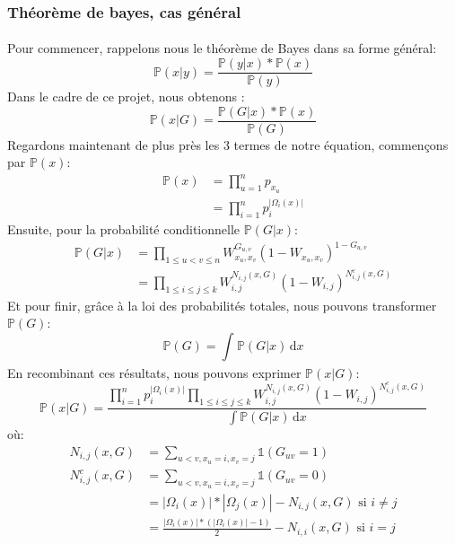 \subsubsection{Théorème de bayes, cas général}
\paragraph{}
Pour commencer, rappelons nous le théorème de Bayes dans sa forme général:
\begin{equation*}
    \mathbb{P}(x|y) = \frac{\mathbb{P}(y|x)*\mathbb{P}(x)}{\mathbb{P}(y)}
\end{equation*}
Dans le cadre de ce projet, nous obtenons :
\begin{equation*}
    \mathbb{P}(x|G) = \frac{\mathbb{P}(G|x)*\mathbb{P}(x)}{\mathbb{P}(G)}
\end{equation*}
Regardons maintenant de plus près les 3 termes de notre équation, commençons par $\mathbb{P}(x)$:
\begin{align*}
    \mathbb{P}(x) &= \prod_{u=1}^n p_{x_u} \\ 
                  &= \prod_{i=1}^n p_i^{|\Omega_i(x)|}
\end{align*}
Ensuite, pour la probabilité conditionnelle $\mathbb{P}(G|x)$:
\begin{align*}
    \mathbb{P}(G|x) &= \prod_{1 \leq u < v \leq n} W_{x_u,x_v}^{G_{u,v}} (1-W_{x_u,x_v})^{1-G_{u,v}}\\ 
                    &= \prod_{1 \leq i \leq j \leq k} W_{i,j}^{N_{i,j}(x,G)} (1-W_{i,j})^{N_{i,j}^c(x,G)}
\end{align*}
Et pour finir, grâce à la loi des probabilités totales, nous pouvons transformer $\mathbb{P}(G)$: 
\begin{equation*}
    \mathbb{P}(G) = \int_{}^{} \mathbb{P}(G|x) \, \mathrm{d}x
\end{equation*}
En recombinant ces résultats, nous pouvons exprimer $\mathbb{P}(x|G)$:
\begin{equation*}
    \mathbb{P}(x|G) = \frac{\prod_{i=1}^n p_i^{|\Omega_i(x)|} \prod_{1 \leq i \leq j \leq k} W_{i,j}^{N_{i,j}(x,G)} (1-W_{i,j})^{N_{i,j}^c(x,G)}}{ \int\mathbb{P}(G|x) \, \mathrm{d}x}
\end{equation*}
où:
\begin{align*}
    N_{i,j}(x,G)&=\sum_{u<v,x_u=i,x_v=j} \mathbb{1} (G_{uv}=1) \\
    N_{i,j}^c(x,G) &= \sum_{u<v,x_u=i,x_v=j} \mathbb{1} (G_{uv}=0)\\
                   &= |\Omega_i(x)|*|\Omega_j(x)| - N_{i,j}(x,G) \text{  si }i \ne j\\
                   &= \frac{|\Omega_i(x)|*(|\Omega_i(x)|-1)}{2} - N_{i,i}(x,G) \text{  si }i = j
\end{align*}
